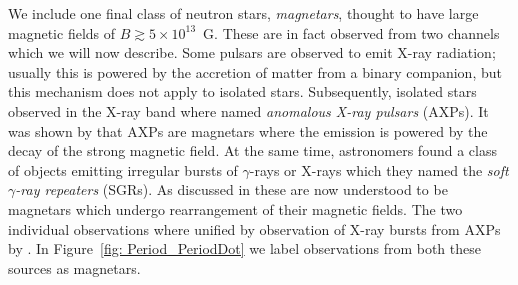 We include one final class of neutron stars, \emph{magnetars}, thought to have
large magnetic fields of $B\gtrsim 5\times10^{13}$~G. These are in fact
observed from two channels which we will now describe. Some pulsars are
observed to emit X-ray radiation; usually this is powered by the accretion of
matter from a binary companion, but this mechanism does not apply to isolated
stars. Subsequently, isolated stars observed in the X-ray band where named
\emph{anomalous X-ray pulsars} (AXPs). It was shown by
\citet{duncan1996magnetars} that AXPs are magnetars where the emission is
powered by the decay of the strong magnetic field.  At the same time,
astronomers found a class of objects emitting irregular bursts of
$\gamma$-rays or X-rays which they named the \emph{soft $\gamma$-ray repeaters}
(SGRs). As discussed in \citet{kouveliotou2003magnetars} these are now
understood to be magnetars which undergo rearrangement of their magnetic
fields. The two individual observations where unified by observation of X-ray
bursts from AXPs by \citet{Gavriil2002}. In Figure~\ref{fig: Period_PeriodDot} we
label observations from both these sources as magnetars.
